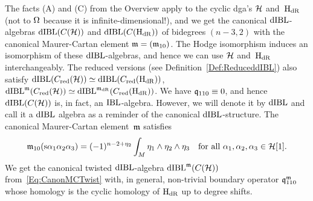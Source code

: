 \documentclass[\MainFolder/Text.tex]{subfiles}
\begin{document}
The facts (A) and (C) from the Overview apply to the cyclic dga's $\mathcal{H}{}$ and~$\mathrm{H}_{\mathrm{dR}}{}$ (not to $\Omega{}$ because it is infinite-dimensional!), and we get the canonical $\mathrm{dIBL}$-algebras $\mathrm{dIBL}(C(\mathcal{H}))$ and $\mathrm{dIBL}(C(\mathrm{H}_{\mathrm{dR}}))$ of bidegrees $(n-3,2)$ with the canonical Maurer-Cartan element $\mathfrak{m} = (\mathfrak{m}_{10})$.
The Hodge isomorphism induces an isomorphism of these $\mathrm{dIBL}$-algebras, and hence we can use $\mathcal{H}$ and~$\mathrm{H}_{\mathrm{dR}}$ interchangeably.
The reduced versions (see Definition~\ref{Def:ReduceddIBL}) also satisfy $\mathrm{dIBL}(C_{\mathrm{red}}(\mathcal{H})) \simeq \mathrm{dIBL}(C_{\mathrm{red}}(\mathrm{H}_{\mathrm{dR}}))$, $\mathrm{dIBL}^{\mathfrak{m}}(C_{\mathrm{red}}(\mathcal{H})) \simeq \mathrm{dIBL}^{\mathfrak{m}_{\mathrm{dR}}}(C_{\mathrm{red}}(\mathrm{H}_{\mathrm{dR}}))$.
We have $\mathfrak{q}_{110} \equiv 0$, and hence $\mathrm{dIBL}(C(\mathcal{H}))$ is, in fact, an $\mathrm{IBL}$-algebra.
However, we will denote it by $\mathrm{dIBL}$ and call it a $\mathrm{dIBL}$ algebra as a reminder of the canonical $\mathrm{dIBL}$-structure.
The canonical Maurer-Cartan element~$\mathfrak{m}$ satisfies
\begin{equation}\label{Eq:CanonMC}
\mathfrak{m}_{10}(\mathrm{s} \alpha_1 \alpha_2 \alpha_3) = (-1)^{n-2 + \eta_2} \int_M \eta_1 \wedge \eta_2 \wedge \eta_3 \quad \text{for all } \alpha_1, \alpha_2, \alpha_3 \in \mathcal{H}[1].
\end{equation}
We get the canonical twisted $\mathrm{dIBL}$-algebra $\mathrm{dIBL}^{\mathfrak{m}}(C(\mathcal{H}))$ from~\eqref{Eq:CanonMCTwist} with, in general, non-trivial boundary operator $\mathfrak{q}_{110}^{\mathfrak{m}}$ whose homology is the cyclic homology of $\mathrm{H}_{\mathrm{dR}}$ up to degree shifts.
%
\end{document}
